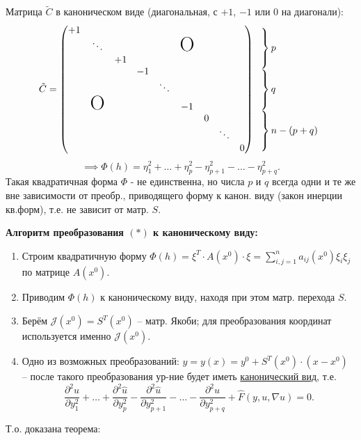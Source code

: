 \documentclass[12pt, a4paper]{article}
\begin{document}
\hfill {} %


Матрица $\tilde{C}$ в каноническом виде (диагональная, с $+1$, $-1$ или $0$ на диагонали):
\[
\tilde{C} = \begin{pmatrix}
+1 & & & & & & \\
 & \ddots & & & & \text{\huge O} & \\
 & & +1 & & & & \\
 & & & -1 & & & \\
 & & & & \ddots & & \\
 & \text{\huge O} & & & & -1 & \\
 & & & & & & 0 \\
 & & & & & & & \ddots \\
 & & & & & & & & 0
\end{pmatrix}
\begin{array}{l}
\left. \vphantom{\begin{matrix} +1 \\ \vdots \\ +1 \end{matrix}} \right\} p \\
\left. \vphantom{\begin{matrix} -1 \\ \vdots \\ -1 \end{matrix}} \right\} q \\
\left. \vphantom{\begin{matrix} 0 \\ \vdots \\ 0 \end{matrix}} \right\} n-(p+q)
\end{array}
\]
\[
\implies \Phi(h) = \eta_1^2 + \dots + \eta_p^2 - \eta_{p+1}^2 - \dots - \eta_{p+q}^2.
\]
Такая квадратичная форма $\Phi$ - не единственна, но числа $p$ и $q$ всегда одни и те же вне зависимости от преобр., приводящего форму к канон. виду (закон инерции кв.форм), т.е. не зависит от матр. $S$.

\textbf{Алгоритм преобразования $(*)$ к каноническому виду:}
\begin{enumerate}
    \item Строим квадратичную форму $\Phi(h) = \xi^T \cdot A(x^0) \cdot \xi = \sum_{i,j=1}^n a_{ij}(x^0) \xi_i \xi_j$ по матрице $A(x^0)$.
    \item Приводим $\Phi(h)$ к каноническому виду, находя при этом матр. перехода $S$.
    \item Берём $\mathcal{J}(x^0) = S^T(x^0)$ -- матр. Якоби; для преобразования координат используется именно $\mathcal{J}(x^0)$.
    \item Одно из возможных преобразований: $y = y(x) = y^0 + S^T(x^0) \cdot (x-x^0)$ -- после такого преобразования ур-ние будет иметь \underline{канонический вид}, т.е.
    \[
    \frac{\partial^2 \hat{u}}{\partial y_1^2} + \dots + \frac{\partial^2 \hat{u}}{\partial y_p^2} - \frac{\partial^2 \hat{u}}{\partial y_{p+1}^2} - \dots - \frac{\partial^2 \hat{u}}{\partial y_{p+q}^2} + \hat{F}(y, u, \nabla u) = 0.
    \]
\end{enumerate}
Т.о. доказана теорема:
\end{document}
